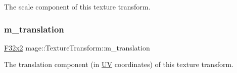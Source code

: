 The scale component of this texture transform. \hypertarget{classmage_1_1_texture_transform_a1a8adc206e6b6f7e3ec255fc82e73524}{}\label{classmage_1_1_texture_transform_a1a8adc206e6b6f7e3ec255fc82e73524} 
\subsubsection{\texorpdfstring{m\+\_\+translation}{m\_translation}}
{\footnotesize\ttfamily \hyperlink{namespacemage_aa87237ad091f5cd7da612b8523fc108f}{F32x2} mage\+::\+Texture\+Transform\+::m\+\_\+translation\hspace{0.3cm}{\ttfamily [private]}}

The translation component (in \hyperlink{structmage_1_1_u_v}{UV} coordinates) of this texture transform. 